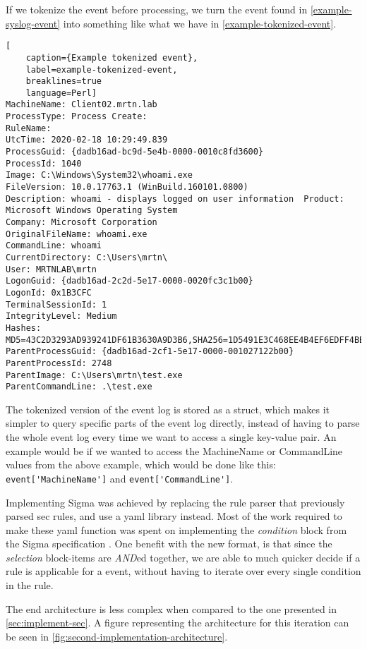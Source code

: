 If we tokenize the event before processing, we turn the event found in \cref{example-syslog-event} into something like what we have in \cref{example-tokenized-event}.
\begin{lstlisting}[
    caption={Example tokenized event},
    label=example-tokenized-event,
    breaklines=true
    language=Perl]
MachineName: Client02.mrtn.lab
ProcessType: Process Create: 
RuleName:   
UtcTime: 2020-02-18 10:29:49.839
ProcessGuid: {dadb16ad-bc9d-5e4b-0000-0010c8fd3600}
ProcessId: 1040
Image: C:\Windows\System32\whoami.exe
FileVersion: 10.0.17763.1 (WinBuild.160101.0800)
Description: whoami - displays logged on user information  Product: Microsoft Windows Operating System
Company: Microsoft Corporation 
OriginalFileName: whoami.exe
CommandLine: whoami
CurrentDirectory: C:\Users\mrtn\
User: MRTNLAB\mrtn
LogonGuid: {dadb16ad-2c2d-5e17-0000-0020fc3c1b00}
LogonId: 0x1B3CFC
TerminalSessionId: 1
IntegrityLevel: Medium
Hashes: MD5=43C2D3293AD939241DF61B3630A9D3B6,SHA256=1D5491E3C468EE4B4EF6EDFF4BBC7D06EE83180F6F0B1576763EA2EFE049493A,IMPHASH=7FF0758B766F747CE57DFAC70743FB88
ParentProcessGuid: {dadb16ad-2cf1-5e17-0000-001027122b00}
ParentProcessId: 2748
ParentImage: C:\Users\mrtn\test.exe
ParentCommandLine: .\test.exe
\end{lstlisting}
The tokenized version of the event log is stored as a struct, which makes it simpler to query specific parts of the event log directly, instead of having to parse the whole event log every time we want to access a single key-value pair. An example would be if we wanted to access the MachineName or CommandLine values from the above example, which would be done like this:  \lstinline{event['MachineName']} and \lstinline{event['CommandLine']}.

Implementing Sigma was achieved by replacing the rule parser that previously parsed \acrshort{sec} rules, and use a \acrshort{yaml} library instead. Most of the work required to make these \acrshort{yaml} function was spent on implementing the \textit{condition} block from the Sigma specification \cite{SigmaSpecification}.
One benefit with the new format, is that since the \textit{selection} block-items are \textit{AND}ed together, we are able to much quicker decide if a rule is applicable for a event, without having to iterate over every single condition in the rule.

The end architecture is less complex when compared to the one presented in \cref{sec:implement-sec}. A figure representing the architecture for this iteration can be seen in \cref{fig:second-implementation-architecture}.


